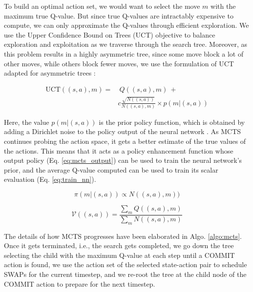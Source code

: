 \documentclass[%
 reprint,
amsmath,amssymb,showkeys,
pra,
]{revtex4-2}
\begin{document}
To build an optimal action set, we would want to select the move $m$ with the maximum true Q-value. But since true Q-values are intractably expensive to compute, we can only approximate the Q-values through efficient exploration. We use the Upper Confidence Bound on Trees (UCT) objective \citep{mcts_uct} to balance exploration and exploitation as we traverse through the search tree. Moreover, as this problem results in a highly asymmetric tree, since some move block a lot of other moves, while others block fewer moves, we use the formulation of UCT adapted for asymmetric trees \citep{mcts_assymetric}:

\begin{equation}\label{eq:uct}
\begin{split}
    \textrm{UCT}((s,a), m) =&\ Q((s,a), m)\ + \\ & c \frac{\sqrt{N((s,a))}}{N((s,a), m)} \times p(m \vert (s,a))
\end{split}
\end{equation}

Here, the value $p(m | (s,a))$ is the prior policy function, which is obtained by adding a Dirichlet noise to the policy output of the neural network \citep{mcts_alphazero}. As MCTS continues probing the action space, it gets a better estimate of the true values of the actions. This means that it acts as a policy enhancement function whose output policy (Eq. \ref{eq:mcts_output}) can be used to train the neural network's prior, and the average Q-value computed can be used to train its scalar evaluation (Eq. \ref{eq:train_nn}).

\begin{equation}\label{eq:mcts_output}
    \pi(m | (s,a)) \propto N((s, a), m))
\end{equation}

\begin{equation}\label{eq:train_nn}
    \mathcal{V}((s,a)) = \frac{\sum_{m} Q((s,a), m)}{\sum_{m} N((s,a), m)}
\end{equation}

The details of how MCTS progresses have been elaborated in Algo. \ref{algo:mcts}. Once it gets terminated, i.e., the search gets completed, we go down the tree selecting the child with the maximum Q-value at each step until a COMMIT action is found, we use the action set of the selected state-action pair to schedule SWAPs for the current timestep, and we re-root the tree at the child node of the COMMIT action to prepare for the next timestep.
\end{document}
